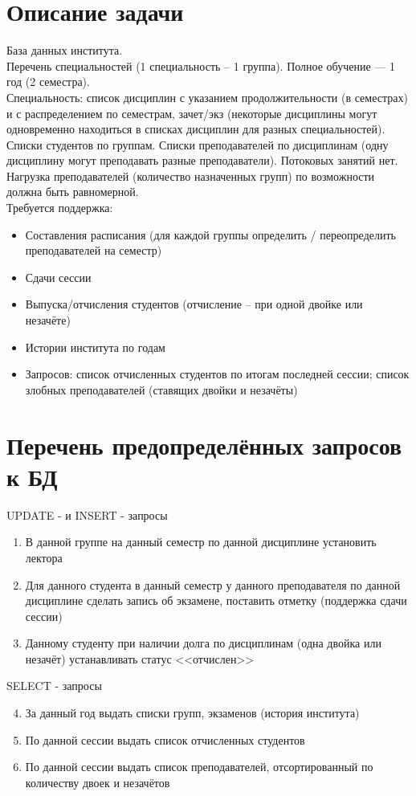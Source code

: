 \documentclass[zuevDbReport.tex]{subfiles}
\begin{document}
\section{Описание задачи}
База данных института.\\
Перечень специальностей (1 специальность – 1 группа). Полное обучение — 1 год (2 семестра).\\
Специальность: список дисциплин с указанием продолжительности (в семестрах) и с распределением по семестрам, зачет/экз (некоторые дисциплины могут одновременно находиться в списках дисциплин для разных специальностей). Списки студентов по группам. Списки преподавателей по дисциплинам (одну дисциплину могут преподавать разные преподаватели). Потоковых занятий нет. Нагрузка преподавателей (количество назначенных групп) по возможности должна быть равномерной.\\
Требуется поддержка:\\
\begin{itemize}
\item{}Составления расписания (для каждой группы определить / переопределить преподавателей на семестр)
\item{}Сдачи сессии
\item{}Выпуска/отчисления студентов (отчисление – при одной двойке или незачёте)
\item{}Истории института по годам
\item{}Запросов: список отчисленных студентов по итогам последней сессии; список злобных преподавателей (ставящих двойки и незачёты)
\end{itemize}

\newpage
\section{Перечень предопределённых запросов к БД}
UPDATE - и INSERT - запросы
\begin{enumerate}
\item{}В данной группе на данный семестр по данной дисциплине установить лектора
\item{}Для данного студента в данный семестр у данного преподавателя по данной дисциплине сделать запись об экзамене, поставить отметку (поддержка сдачи сессии)
\item{}Данному студенту при наличии долга по дисциплинам (одна двойка или незачёт) устанавливать статус <<отчислен>>
\end{enumerate}
SELECT - запросы
\begin{enumerate}
\setcounter{enumi}{3}
\item{}За данный год выдать списки групп, экзаменов (история института)
\item{}По данной сессии выдать список отчисленных студентов
\item{}По данной сессии выдать список преподавателей, отсортированный по количеству двоек и незачётов
\end{enumerate}
\end{document}
